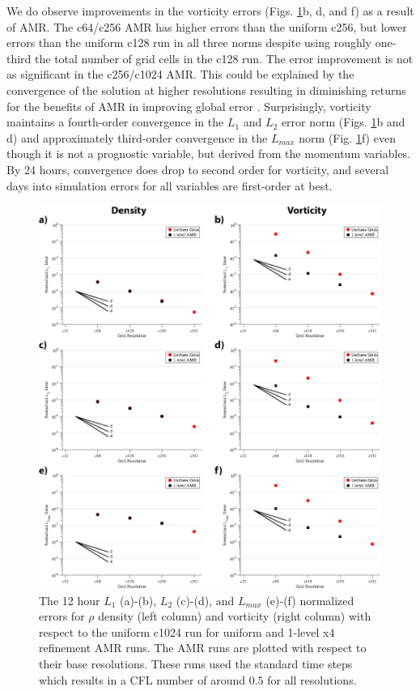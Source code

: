 We do observe improvements in the vorticity errors (Figs. \ref{fig:largedterror}b, d, and f) as a result of AMR. 
The c64/c256 AMR has higher errors than the uniform c256, but lower errors than the uniform c128 run 
in all three norms despite using roughly one-third the total number of grid cells in the c128 run.  The error improvement
is not as significant in the c256/c1024 AMR. This could be explained by the convergence of the solution at higher resolutions
resulting in diminishing returns for the benefits of AMR in improving global error \citep{lin2017colliding}.
Surprisingly, vorticity maintains a fourth-order convergence in the $L_1$ and $L_2$ error norm (Figs.  \ref{fig:largedterror}b and d)
and approximately third-order convergence in the $L_{max}$ norm (Fig.  \ref{fig:largedterror}f) even though it is not a prognostic variable, 
but derived from the momentum variables. By 24 hours, convergence does drop to second order for vorticity, 
and several days into simulation errors for all variables are first-order at best.

\begin{figure}
    \centerline{%
    \noindent
    \includegraphics[width=\textwidth,height=\textheight,keepaspectratio]{Chap3/long_run_normerrs-01.eps}}
    \caption{The 12 hour $L_1$ (a)-(b), $L_2$ (c)-(d), and $L_{max}$ (e)-(f) normalized errors for
    $\rho$ density (left column) and vorticity (right column) with
    respect to the uniform c1024 run for uniform and 1-level x4 refinement 
    AMR runs. The AMR runs are plotted with respect to their base resolutions.
    These runs used the standard time steps which results in
    a CFL number of around $0.5$ for all resolutions.
}%
    \label{fig:largedterror}
\end{figure}

